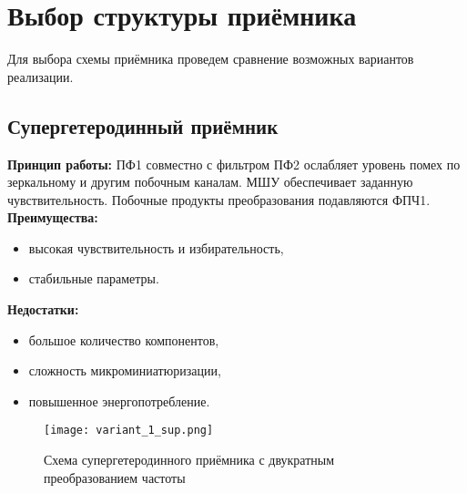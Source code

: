 \documentclass[a4paper,12pt]{article}
\begin{document}
\section{Выбор структуры приёмника}
Для выбора схемы приёмника проведем сравнение возможных вариантов реализации.
\subsection{Супергетеродинный приёмник}
\textbf{Принцип работы:} \newline
ПФ1 совместно с фильтром ПФ2 ослабляет уровень помех по зеркальному и другим побочным каналам. МШУ обеспечивает заданную чувствительность. Побочные продукты преобразования подавляются ФПЧ1.
\newline
\newline
\textbf{Преимущества:}
\begin{itemize}
    \item высокая чувствительность и избирательность,
    \item стабильные параметры.
\end{itemize}
\textbf{Недостатки:}
\begin{itemize}
    \item большое количество компонентов,
    \item сложность микроминиатюризации,
    \item повышенное энергопотребление.
\end{itemize}

\begin{figure}[H]
    \centering
    \texttt{[image: variant\_1\_sup.png]}
    \caption{Схема супергетеродинного приёмника с двукратным преобразованием частоты}
    \label{fig:enter-label}
\end{figure}
\end{document}
